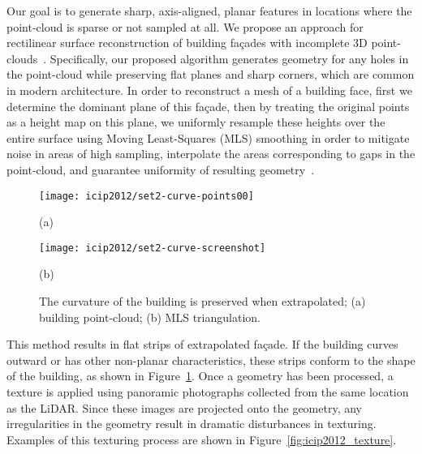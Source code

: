 \documentclass[12pt,onecolumn,oneside]{book}
\begin{document}
Our goal is to generate sharp, axis-aligned, planar features in locations where the point-cloud is sparse or not sampled at all.  We propose an approach for rectilinear surface reconstruction of building fa\c{c}ades with incomplete 3D point-clouds~\cite{Turner12outdoor}.  Specifically, our proposed algorithm generates geometry for any holes in the point-cloud while preserving flat planes and sharp corners, which are common in modern architecture.  In order to reconstruct a mesh of a building face, first we determine the dominant plane of this fa\c{c}ade, then by treating the original points as a height map on this plane, we uniformly resample these heights over the entire surface using Moving Least-Squares (MLS) smoothing in order to mitigate noise in areas of high sampling, interpolate the areas corresponding to gaps in the point-cloud, and guarantee uniformity of resulting geometry~\cite{Nealen04}.

\begin{figure}[t]

\begin{minipage}[b]{0.5\linewidth}
  \centering
  \centerline{\texttt{[image: icip2012/set2-curve-points00]}}
  \centerline{(a)}\medskip
\end{minipage}
\hfill
\begin{minipage}[b]{0.5\linewidth}
  \centering
  \centerline{\texttt{[image: icip2012/set2-curve-screenshot]}}
  \centerline{(b)}\medskip
\end{minipage}
%
\caption[Surface reconstruction of building fa\c{c}ade.]{The curvature of the building is preserved when extrapolated; (a) building point-cloud; (b) MLS triangulation.}
\label{fig:extrapolate}
%
\end{figure}

This method results in flat strips of extrapolated fa\c{c}ade.  If the building curves outward or has other non-planar characteristics, these strips conform to the shape of the building, as shown in Figure~\ref{fig:extrapolate}.  Once a geometry has been processed, a texture is applied using panoramic photographs collected from the same location as the LiDAR.  Since these images are projected onto the geometry, any irregularities in the geometry result in dramatic disturbances in texturing.  Examples of this texturing process are shown in Figure~\ref{fig:icip2012_texture}.
\end{document}
